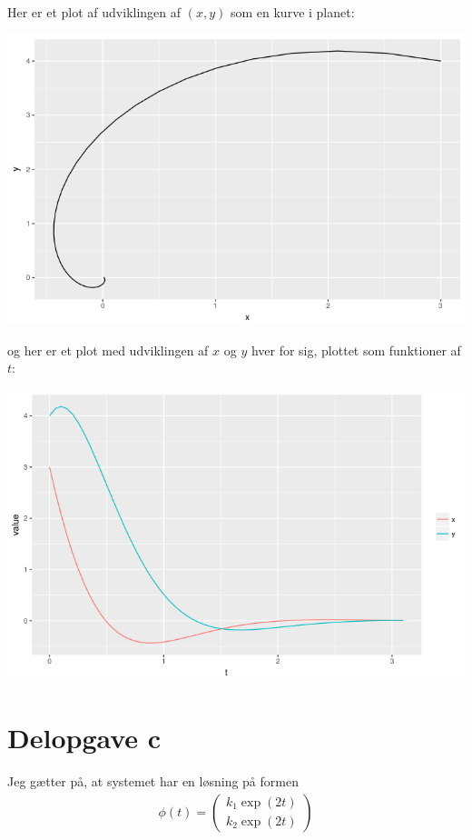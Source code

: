 \documentclass[12pt]{article}
\begin{document}
Her er et plot af udviklingen af $(x,y)$ som en kurve i planet:
\begin{center}
\includegraphics[scale=0.5]{q2p2.png}
\end{center}
og her er et plot med udviklingen af $x$ og $y$ hver for sig, plottet som funktioner af $t$:
\begin{center}
\includegraphics[scale=0.5]{q2p3.png}
\end{center}

\section{Delopgave c}

Jeg gætter på, at systemet har en løsning på formen
\begin{align}
\phi(t) = \begin{pmatrix}
k_1 \exp(2t) \\ k_2 \exp(2t)
\end{pmatrix}
\end{align}
\end{document}
